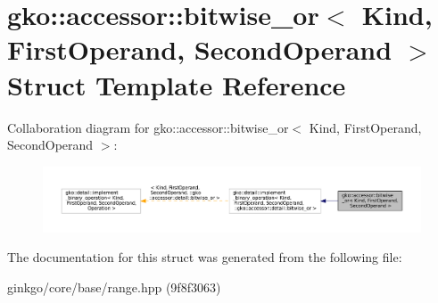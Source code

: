 \hypertarget{structgko_1_1accessor_1_1bitwise__or}{}\section{gko\+:\+:accessor\+:\+:bitwise\+\_\+or$<$ Kind, First\+Operand, Second\+Operand $>$ Struct Template Reference}
\label{structgko_1_1accessor_1_1bitwise__or}


Collaboration diagram for gko\+:\+:accessor\+:\+:bitwise\+\_\+or$<$ Kind, First\+Operand, Second\+Operand $>$\+:
\nopagebreak
\begin{figure}[H]
\begin{center}
\leavevmode
\includegraphics[width=350pt]{structgko_1_1accessor_1_1bitwise__or__coll__graph}
\end{center}
\end{figure}


The documentation for this struct was generated from the following file\+:\begin{DoxyCompactItemize}
\item 
ginkgo/core/base/range.\+hpp (9f8f3063)\end{DoxyCompactItemize}

